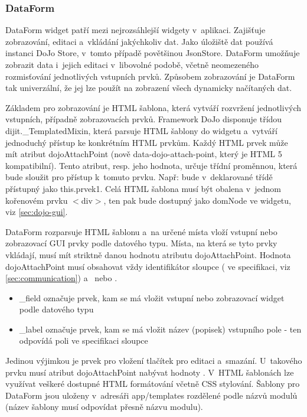 \documentclass[bc,male,html,dept460]{diploma}				%
\begin{document}
\subsubsection{DataForm}
\label{sec:DataForm}
DataForm widget patří mezi nejrozsáhlejší widgety v~aplikaci. Zajišťuje zobrazování, editaci a~vkládání jakýchkoliv dat.
Jako úložiště dat používá instanci DoJo Store, v~tomto případě povětšinou JsonStore.
DataForm umožňuje zobrazit data i~jejich editaci v~libovolné podobě, včetně neomezeného rozmisťování jednotlivých vstupních prvků.
Způsobem zobrazování je DataForm tak univerzální, že jej lze použít na zobrazení všech dynamicky načítaných dat.

Základem pro zobrazování je HTML šablona, která vytváří rozvržení jednotlivých vstupních, případně zobrazovacích prvků.
Framework DoJo disponuje třídou dijit.\_TemplatedMixin, která parsuje HTML šablony do widgetu a~vytváří jednoduchý přístup ke konkrétním HTML prvkům. Každý HTML prvek může mít atribut dojoAttachPoint (nově data-dojo-attach-point, který je HTML 5 kompatibilní). Tento atribut, resp. jeho hodnota, určuje třídní proměnnou, která bude sloužit pro přístup k~tomuto prvku.
Např:
bude v~deklarované třídě přístupný jako this.prvek1. Celá HTML šablona musí být obalena v~jednom kořenovém prvku $<$div$>$, ten pak bude dostupný jako domNode ve widgetu, viz \ref{sec:dojo-gui}.

DataForm rozparsuje HTML šablonu a~na určené místa vloží vstupní nebo zobrazovací GUI prvky podle datového typu. Místa, na která se tyto prvky vkládají, musí mít striktně danou hodnotu atributu dojoAttachPoint.
Hodnota dojoAttachPoint musí obsahovat vždy identifikátor sloupce ( ve specifikaci, viz \ref{sec:communication}) a~ nebo .

\begin{itemize}
 \item \_field označuje prvek, kam se má vložit vstupní nebo zobrazovací widget podle datového typu
 \item \_label označuje prvek, kam se má vložit název (popisek) vstupního pole - ten odpovídá poli  ve specifikaci sloupce
\end{itemize}

Jedinou výjimkou je prvek pro vložení tlačítek pro editaci a~smazání. U~takového prvku musí atribut dojoAttachPoint nabývat hodnoty .
V~HTML šablonách lze využívat veškeré dostupné HTML formátování včetně CSS stylování. Šablony pro DataForm jsou uloženy v~adresáři app/templates rozdělené podle názvů modulů (název šablony musí odpovídat přesně názvu modulu).
\end{document}
